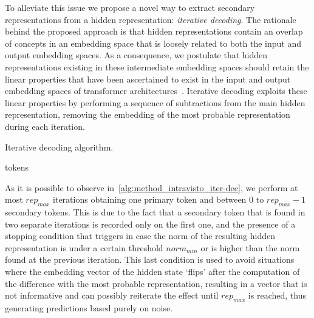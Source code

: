To alleviate this issue we propose a novel way to extract secondary representations from a hidden representation: \emph{iterative decoding}.
The rationale behind the proposed approach is that hidden representations contain an overlap of concepts in an embedding space that is loosely related to both the input and output embedding spaces.
As a consequence, we postulate that hidden representations existing in these intermediate embedding spaces should retain the linear properties that have been ascertained to exist in the input and output embedding spaces of transformer architectures~\cite{mikolov2013,park2023}.
Iterative decoding exploits these linear properties by performing a sequence of subtractions from the main hidden representation, removing the embedding of the most probable representation during each iteration.

\begin{algorithm}
    \caption{Iterative decoding algorithm.}\label{alg:method_intravisto_iter-dec}
    \begin{algorithmic}
            \ENDIF{}
            \ENDIF{}
        \ENDWHILE{}
        \RETURN tokens
    \end{algorithmic}
\end{algorithm}

As it is possible to observe in~\cref{alg:method_intravisto_iter-dec}, we perform at most ${rep}_{max}$ iterations obtaining one primary token and between $0$ to ${rep}_{max} - 1$ secondary tokens.
This is due to the fact that a secondary token that is found in two separate iterations is recorded only on the first one, and the presence of a stopping condition that triggers in case the norm of the resulting hidden representation is under a certain threshold ${norm}_{min}$ or is higher than the norm found at the previous iteration.
This last condition is used to avoid situations where the embedding vector of the hidden state `flips' after the computation of the difference with the most probable representation, resulting in a vector that is not informative and can possibly reiterate the effect until ${rep}_{max}$ is reached, thus generating predictions based purely on noise.

